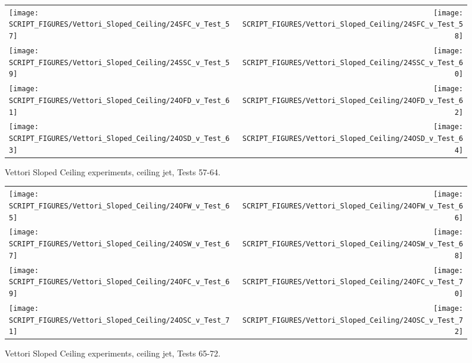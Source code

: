 \begin{figure}[p]
\begin{tabular*}{\textwidth}{l@{\extracolsep{\fill}}r}
\texttt{[image: SCRIPT\_FIGURES/Vettori\_Sloped\_Ceiling/24SFC\_v\_Test\_57]} &
\texttt{[image: SCRIPT\_FIGURES/Vettori\_Sloped\_Ceiling/24SFC\_v\_Test\_58]} \\
\texttt{[image: SCRIPT\_FIGURES/Vettori\_Sloped\_Ceiling/24SSC\_v\_Test\_59]} &
\texttt{[image: SCRIPT\_FIGURES/Vettori\_Sloped\_Ceiling/24SSC\_v\_Test\_60]} \\
\texttt{[image: SCRIPT\_FIGURES/Vettori\_Sloped\_Ceiling/24OFD\_v\_Test\_61]} &
\texttt{[image: SCRIPT\_FIGURES/Vettori\_Sloped\_Ceiling/24OFD\_v\_Test\_62]} \\
\texttt{[image: SCRIPT\_FIGURES/Vettori\_Sloped\_Ceiling/24OSD\_v\_Test\_63]} &
\texttt{[image: SCRIPT\_FIGURES/Vettori\_Sloped\_Ceiling/24OSD\_v\_Test\_64]} \\
\end{tabular*}
\caption{Vettori Sloped Ceiling experiments, ceiling jet, Tests 57-64.}
\label{Vettori_Sloped_8}
\end{figure}

\begin{figure}[p]
\begin{tabular*}{\textwidth}{l@{\extracolsep{\fill}}r}
\texttt{[image: SCRIPT\_FIGURES/Vettori\_Sloped\_Ceiling/24OFW\_v\_Test\_65]} &
\texttt{[image: SCRIPT\_FIGURES/Vettori\_Sloped\_Ceiling/24OFW\_v\_Test\_66]} \\
\texttt{[image: SCRIPT\_FIGURES/Vettori\_Sloped\_Ceiling/24OSW\_v\_Test\_67]} &
\texttt{[image: SCRIPT\_FIGURES/Vettori\_Sloped\_Ceiling/24OSW\_v\_Test\_68]} \\
\texttt{[image: SCRIPT\_FIGURES/Vettori\_Sloped\_Ceiling/24OFC\_v\_Test\_69]} &
\texttt{[image: SCRIPT\_FIGURES/Vettori\_Sloped\_Ceiling/24OFC\_v\_Test\_70]} \\
\texttt{[image: SCRIPT\_FIGURES/Vettori\_Sloped\_Ceiling/24OSC\_v\_Test\_71]} &
\texttt{[image: SCRIPT\_FIGURES/Vettori\_Sloped\_Ceiling/24OSC\_v\_Test\_72]} \\
\end{tabular*}
\caption{Vettori Sloped Ceiling experiments, ceiling jet, Tests 65-72.}
\label{Vettori_Sloped_9}
\end{figure}

\clearpage




